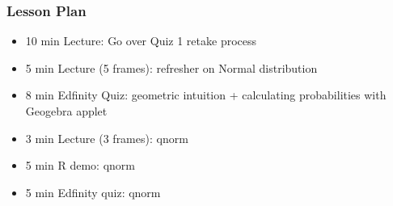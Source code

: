 \begin{frame}
    \frametitle{Lesson Plan}
    \begin{itemize}
        \item 10 min Lecture: Go over Quiz 1 retake process

        \item 5 min Lecture (5 frames): refresher on Normal distribution 
        \item 8 min Edfinity Quiz: geometric intuition + calculating probabilities with Geogebra applet

        \item 3 min Lecture (3 frames): qnorm
        \item 5 min R demo: qnorm
        \item 5 min Edfinity quiz: qnorm
        
    \end{itemize}
\end{frame}




